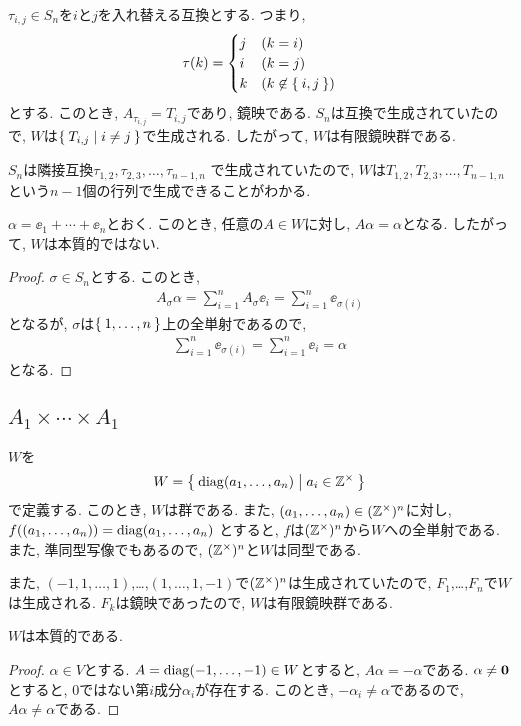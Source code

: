$\tau_{i,j}\in S_n$を$i$と$j$を入れ替える互換とする.
つまり,
\begin{align*}
  \tau(k)=
  \begin{cases}
    j&(k=i)\\
    i&(k=j)\\
    k&(k\not\in\Set{i,j})
  \end{cases}
\end{align*}
とする.
このとき, $A_{\tau_{i,j}}=T_{i,j}$であり, 鏡映である.
$S_n$は互換で生成されていたので, $W$は$\Set{T_{i,j}|i\neq j}$で生成される.
したがって, $W$は有限鏡映群である.


$S_n$は隣接互換$\tau_{1,2},\tau_{2,3},\ldots,\tau_{n-1,n}$
で生成されていたので,
$W$は$T_{1,2},T_{2,3},\ldots,T_{n-1,n}$という$n-1$個の行列で生成できることがわかる.


\begin{prop}
$\alpha=\ee_1+\cdots+\ee_n$とおく.
このとき, 任意の$A\in W$に対し,
$A\alpha=\alpha$となる.
したがって, $W$は本質的ではない.
\end{prop}
\begin{proof}
  $\sigma\in S_n$とする.
  このとき,
  \begin{align*}
    A_\sigma \alpha=\sum_{i=1}^{n}A_\sigma \ee_i=\sum_{i=1}^{n} \ee_{\sigma(i)}
  \end{align*}
  となるが, $\sigma$は$\Set{1,\ldots,n}$上の全単射であるので,
  \begin{align*}
    \sum_{i=1}^{n} \ee_{\sigma(i)}=\sum_{i=1}^{n} \ee_i=\alpha
  \end{align*}
  となる.
\end{proof}


\subsection{$A_1\times \cdots \times A_1$}
\label{ex:a1n:grp}
$W$を
\begin{align*}
 W= \Set{\operatorname{diag}(a_1,\ldots,a_n)|a_i\in \mathbb{Z}^\times}
\end{align*}
で定義する.
このとき, $W$は群である.
また,
$(a_1,\ldots,a_n)\in (\mathbb{Z}^\times)^n$に対し,
$f((a_1,\ldots,a_n))=\operatorname{diag}(a_1,\ldots,a_n)$
とすると,
$f$は$(\mathbb{Z}^\times)^n$から$W$への全単射である.
また, 準同型写像でもあるので,
$(\mathbb{Z}^\times)^n$と$W$は同型である.

また, $(-1,1,\ldots,1)$,\ldots,$(1,\ldots,1,-1)$で$ (\mathbb{Z}^\times)^n$は生成されていたので,
$F_1$,\ldots,$F_n$で$W$は生成される.
$F_k$は鏡映であったので,
$W$は有限鏡映群である.

\begin{prop}
  $W$は本質的である.
\end{prop}
\begin{proof}
  $\alpha\in V$とする.
  $A=\operatorname{diag}(-1,\ldots,-1)\in W$とすると,
  $A\alpha=-\alpha$である.
  $\alpha\neq \boldsymbol{0}$とすると,
  $0$ではない第$i$成分$\alpha_i$が存在する.
  このとき, $-\alpha_i\neq \alpha$であるので,
  $A\alpha\neq \alpha$である.
\end{proof}


